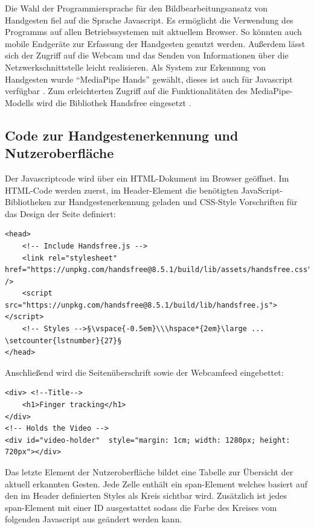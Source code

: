 \documentclass[a4paper,12pt,final]{article} %
\numberwithin{equation}{section} %
\numberwithin{figure}{section} %
\numberwithin{table}{section} %
\begin{document}
Die Wahl der Programmiersprache für den Bildbearbeitungsansatz von Handgesten fiel auf die Sprache Javascript. Es ermöglicht die Verwendung des Programms auf allen Betriebssystemen mit aktuellem Browser. So könnten auch mobile Endgeräte zur Erfassung der Handgesten genutzt werden.
Außerdem lässt sich der Zugriff auf die Webcam und das Senden von Informationen über die Netzwerkschnittstelle leicht realisieren. 
Als System zur Erkennung von Handgesten wurde \enquote{MediaPipe Hands} gewählt, dieses ist auch für Javascript verfügbar \cite{MediaPipeHands}.
Zum erleichterten Zugriff auf die Funktionalitäten des MediaPipe-Modells wird die Bibliothek Handsfree eingesetzt \cite{Handsfree}.

\subsection{Code zur Handgestenerkennung und Nutzeroberfläche}
Der Javascriptcode wird über ein HTML-Dokument im Browser geöffnet.
Im HTML-Code werden zuerst, im Header-Element die benötigten JavaScript-Bibliotheken zur Handgestenerkennung geladen und CSS-Style Vorschriften für das Design der Seite definiert:
 
 \begin{lstlisting}[firstnumber=3]
<head>
    <!-- Include Handsfree.js -->
    <link rel="stylesheet" href="https://unpkg.com/handsfree@8.5.1/build/lib/assets/handsfree.css" />
    <script src="https://unpkg.com/handsfree@8.5.1/build/lib/handsfree.js"></script>
    <!-- Styles -->§\vspace{-0.5em}\\\hspace*{2em}\large ... \setcounter{lstnumber}{27}§
</head>
 \end{lstlisting}

 Anschließend wird die Seitenüberschrift sowie der Webcamfeed eingebettet:
 
\begin{lstlisting}[firstnumber=30]
<div> <!--Title-->
	<h1>Finger tracking</h1>
</div>
<!-- Holds the Video -->
<div id="video-holder"  style="margin: 1cm; width: 1280px; height: 720px"></div> 
\end{lstlisting}

Das letzte Element der Nutzeroberfläche bildet eine Tabelle zur Übersicht der aktuell erkannten Gesten. Jede Zelle enthält ein span-Element welches basiert auf den im Header definierten Styles als Kreis sichtbar wird. Zusätzlich ist jedes span-Element mit einer ID ausgestattet sodass die Farbe des Kreises vom folgenden Javascript aus geändert werden kann.
\end{document}
